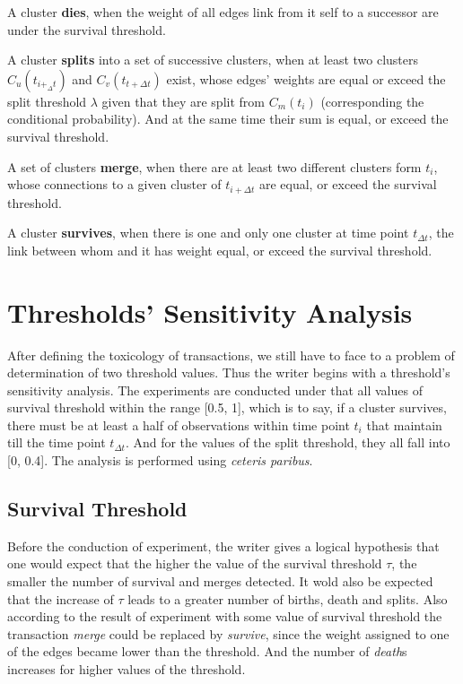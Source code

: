 \documentclass{sig-alternate-05-2015}
\begin{document}
A cluster \textbf{dies}, when the weight of all edges link from it self to a successor are under the survival threshold.

A cluster \textbf{splits} into a set of successive clusters, when at least two clusters $C_u(t_{i+_\Delta t})$ and $C_v(t_{t+\Delta t})$ exist, whose edges' weights are equal or exceed the split threshold $\lambda$ given that they are split from $C_m(t_i)$ (corresponding the conditional probability). And at the same time their sum is equal, or exceed the survival threshold.

A set of clusters \textbf{merge}, when there are at least two different clusters form $t_i$, whose connections to a given cluster of $t_{i+\Delta t}$ are equal, or exceed the survival threshold.

A cluster \textbf{survives}, when there is one and only one cluster at time point $t_{\Delta t}$, the link between whom and it has weight equal, or exceed the survival threshold.

\section{Thresholds' Sensitivity Analysis}
After defining the toxicology of transactions, we still have to face to a problem of determination of two threshold values. Thus the writer begins with a threshold's sensitivity analysis. The experiments are conducted under that all values of survival threshold within the range [0.5, 1], which is to say, if a cluster survives, there must be at least a half of observations within time point $t_i$ that maintain till the time point $t_{\Delta t}$. And for the values of the split threshold, they all fall into [0, 0.4]. The analysis is performed using \emph{ceteris paribus}.
\subsection{Survival Threshold}
Before the conduction of experiment, the writer gives a logical hypothesis that one would expect that the higher the value of the survival threshold $\tau$, the smaller the number of survival and merges detected. It wold also be expected that the increase of $\tau$ leads to a greater number of births, death and splits. Also according to the result of experiment with some value of survival threshold the transaction \emph{merge} could be replaced by \emph{survive}, since the weight assigned to one of the edges became lower than the threshold. And the number of \emph{death}s increases for higher values of the threshold.
\end{document}
